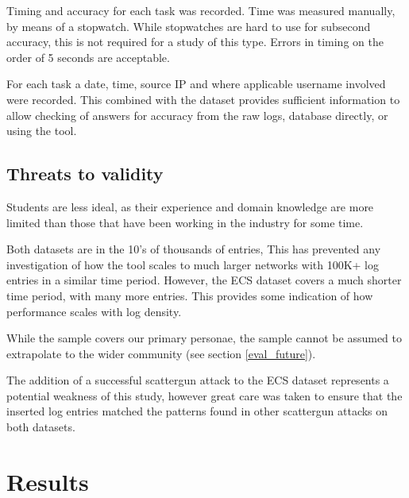 Timing and accuracy for each task was recorded. 
Time was measured manually, by means of a stopwatch. While stopwatches are hard to use for subsecond accuracy, this is not required for a study of this type. Errors in timing on the order of 5 seconds are acceptable.

For each task a date, time, source IP and where applicable username involved were recorded. This combined with the dataset provides sufficient information to allow checking of answers for accuracy from the raw logs, database directly, or using the tool. 

\subsection{Threats to validity}\label{res_threats}

Students are less ideal, as their experience and domain knowledge are more limited than those that have been working in the industry for some time.
 
Both datasets are in the 10's of thousands of entries, This has prevented any investigation of how the tool scales to much larger networks with 100K+ log entries in a similar time period. However, the ECS dataset covers a much shorter time period, with many more entries. This provides some indication of how performance scales with log density.
 
While the sample covers our primary personae, the sample cannot be assumed to extrapolate to the wider community (see section \ref{eval_future}).

The addition of a successful scattergun attack to the ECS dataset represents a potential weakness of this study, however great care was taken to ensure that the inserted log entries matched the patterns found in other scattergun attacks on both datasets. 

\section{Results}\label{res_res}

